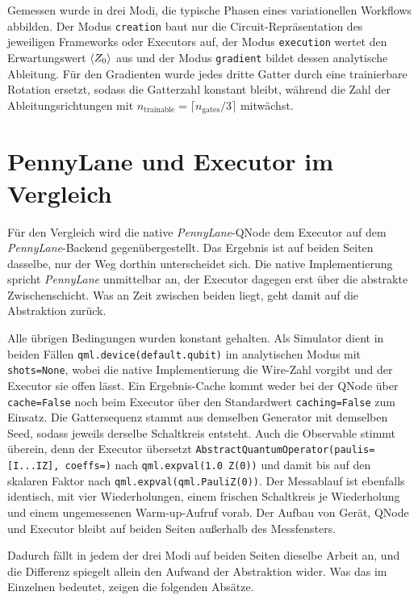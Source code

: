 Gemessen wurde in drei Modi, die typische Phasen eines variationellen Workflows
abbilden. Der Modus \texttt{creation} baut nur die Circuit-Repräsentation des jeweiligen Frameworks oder Executors auf, der
Modus \texttt{execution} wertet den Erwartungswert $\expval{Z_0}$ aus und der Modus
\texttt{gradient} bildet dessen analytische Ableitung. Für den Gradienten wurde
jedes dritte Gatter durch eine trainierbare Rotation ersetzt, sodass die Gatterzahl
konstant bleibt, während die Zahl der Ableitungsrichtungen mit
$n_{\mathrm{trainable}} = \lceil n_{\mathrm{gates}}/3 \rceil$ mitwächst.

\section{PennyLane und Executor im Vergleich}
\label{sec:vergleich-pennylane}
Für den Vergleich wird die native \textit{PennyLane}-QNode dem Executor auf dem
\textit{PennyLane}-Backend gegenübergestellt. Das Ergebnis ist auf beiden Seiten
dasselbe, nur der Weg dorthin unterscheidet sich. Die native Implementierung spricht
\textit{PennyLane} unmittelbar an, der Executor dagegen erst über die abstrakte
Zwischenschicht. Was an Zeit zwischen beiden liegt, geht damit auf die Abstraktion
zurück.

Alle übrigen Bedingungen wurden konstant gehalten. Als Simulator dient in beiden
Fällen \texttt{qml.\allowbreak device(\textquotedbl default.\allowbreak qubit\textquotedbl)} im analytischen Modus mit
\texttt{shots=None}, wobei die native Implementierung die Wire-Zahl vorgibt und der Executor sie
offen lässt. Ein Ergebnis-Cache kommt weder bei der QNode über \texttt{cache=False}
noch beim Executor über den Standardwert \texttt{caching=False} zum Einsatz. Die
Gattersequenz stammt aus demselben Generator mit demselben Seed, sodass jeweils
derselbe Schaltkreis entsteht. Auch die Observable stimmt überein, denn der Executor
übersetzt \texttt{Abstract\allowbreak Quantum\allowbreak Operator\allowbreak(paulis=[\textquotedbl I...IZ\textquotedbl], \allowbreak coeffs=\allowbreak[1.0])} nach \texttt{qml.\allowbreak expval\allowbreak(1.0 \allowbreak * \allowbreak Z(0))} und damit bis auf den skalaren Faktor nach
\texttt{qml.\allowbreak expval(qml.\allowbreak PauliZ(0))}. Der Messablauf ist ebenfalls identisch, mit vier
Wiederholungen, einem frischen Schaltkreis je Wiederholung und einem ungemessenen
Warm-up-Aufruf vorab. Der Aufbau von Gerät, QNode und Executor bleibt auf beiden
Seiten außerhalb des Messfensters.

Dadurch fällt in jedem der drei Modi auf beiden Seiten dieselbe Arbeit an, und die
Differenz spiegelt allein den Aufwand der Abstraktion wider. Was das im Einzelnen
bedeutet, zeigen die folgenden Absätze.


